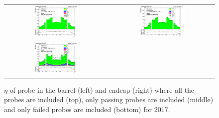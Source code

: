\begin{figure}[htp]
  \begin{center}
    \begin{tabular}{cc}
      \includegraphics[width=0.45\textwidth]{figures/Zprime/2017/ScaleFactor/SameSign/nominal/stack_eta_BE_Barrel+Endcap_probes_PUW.png} &
      \includegraphics[width=0.45\textwidth]{figures/Zprime/2017/ScaleFactor/SameSign/nominal/stack_eta_BE_Barrel+Endcap_pass_PUW.png} \\
      \includegraphics[width=0.45\textwidth]{figures/Zprime/2017/ScaleFactor/SameSign/nominal/stack_eta_BE_Barrel+Endcap_fail_PUW.png} &
    \end{tabular}
    \caption{$\eta$ of probe in the barrel (left) and endcap (right) where all the probes are included (top), only passing probes are included (middle) and only failed probes are included (bottom) for 2017.}
    \label{fig:SS_nominal_eta_2017}
  \end{center}
\end{figure}
